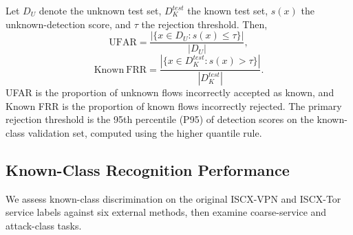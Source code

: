 Let $D_U$ denote the unknown test set, $D_K^{test}$ the known test set, $s(x)$ the unknown-detection score, and $\tau$ the rejection threshold. Then,
\begin{equation*}
\mathrm{UFAR}=\frac{|\{x\in D_U:s(x)\leq\tau\}|}{|D_U|},
\end{equation*}
\begin{equation*}
\mathrm{Known\ FRR}=\frac{|\{x\in D_K^{test}:s(x)>\tau\}|}{|D_K^{test}|}.
\end{equation*}
UFAR is the proportion of unknown flows incorrectly accepted as known, and Known FRR is the proportion of known flows incorrectly rejected. The primary rejection threshold is the 95th percentile (P95) of detection scores on the known-class validation set, computed using the higher quantile rule.

\subsection{Known-Class Recognition Performance}\label{sec:known-recognition}
We assess known-class discrimination on the original ISCX-VPN and ISCX-Tor service labels against six external methods, then examine coarse-service and attack-class tasks.


